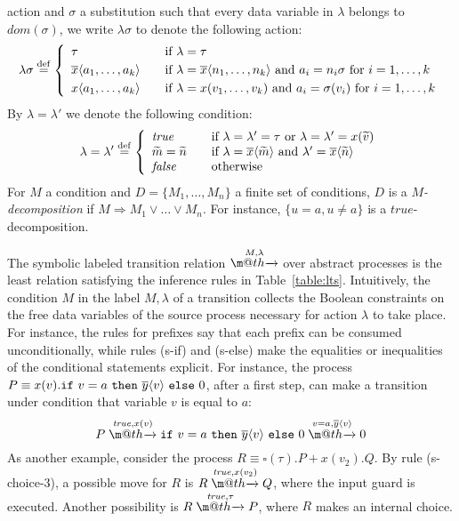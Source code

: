 \documentclass[submission,copyright,creativecommons]{eptcs}
\makeatletter
\newcommand{\opaque}{\square}
\newcommand{\outp}[2]{\overline{#1}\langle{#2}\rangle}
\newcommand{\inp}[2]{#1(#2)}
\newcommand{\finp}[2]{{#1}\langle{#2}\rangle}
\newcommand{\ifte}[3]{{\tt if}\ #1\ {\tt then }\ #2\ {\tt else }\ #3}
\newcommand{\tuple}[1]{\widetilde{#1}}
\newcommand{\act}{\lambda}
\newcommand{\tr}[1]{\stackrel{#1}{\rightarrowfill}}
\newcommand{\true}{\mathit{true}}
\newcommand{\false}{\mathit{false}}
\def \rightarrowfill{\m@th\mathord{\smash-}\mkern-6mu\cleaders\hbox{$\mkern-2mu\mathord{\smash-}\mkern-2mu$}\hfill
  \mkern-6mu\mathord\rightarrow}
\newcommand{\dom}{\mathit{dom}}
\makeatother
\begin{document}
action and $\sigma$ a substitution such that every data variable in 
$\lambda$ belongs to $\dom(\sigma)$, we write $\lambda \sigma$ to 
denote the following action:
 \[
   \act \sigma \mathrel{\mathop{=}\limits^{\rm def}}   
     \left \{ 
             {\begin{array}{l@{\qquad}l}
              \tau & \mbox{if $\lambda = \tau$}\\[1mm]
              \outp x {a_1,\ldots,a_k} & \mbox{if $\lambda = \outp x 
               {n_1,\ldots,n_k}$ and $a_i = n_i \sigma$ for 
                $i=1,\ldots,k$}\\[1mm]
              \finp x {a_1,\ldots,a_k} & \mbox{if $\lambda = \inp x 
                {v_1,\ldots,v_k}$ and $a_i = \sigma(v_i)$ for $i=1,\ldots,k$}
              \end{array}}
      \right .
 \]
By $\act = \act'$ we denote the following condition:
\[
 \act = \act' \mathrel{\mathop{=}\limits^{\rm def}}
   \left \{ 
             {\begin{array}{l@{\qquad}l}
   \true & \mbox{if $\act=\act'=\tau$ or $\act= \act' = \inp x {\tuple v}$}\\  
   \tuple m  = \tuple n & \mbox{if $\act= \outp x {\tuple m}$ and 
    $\act'=\outp x {\tuple n}$}\\
  \false & \mbox{otherwise}
  \end{array}}
 \right .
\]  
For $M$ a condition and $D =\{M_1,\ldots,M_n\}$ a finite set of
conditions, $D$ is a {\em $M$-decomposition} if $M\Rightarrow M_1 \vee
\ldots \vee M_n $.  For instance, $\{u=a, u \neq a \}$ is a
$\true$-decomposition.

The symbolic labeled transition relation $\tr {M, \act}$ over abstract 
processes is the least relation satisfying the inference rules in
Table~\ref{table:lts}. 
Intuitively, the condition $M$ in the label $M, \act$ of a transition 
collects the Boolean constraints on the free data variables of the source 
process necessary for action $\act$ to take place. For instance, the rules 
for prefixes say that each prefix can be consumed unconditionally, while 
rules ({\sc s-if}) and ({\sc  s-else}) make the equalities or inequalities of 
the conditional statements explicit. For instance, the process $P \equiv \inp x v.
\ifte{v =a} {\outp y v}{0}$, after a first step, can make a transition
under condition that variable $v$ is equal to $a$:
\[
  P \tr {\true, \inp x v} \ifte{v =a} {\outp y v}{0} \tr {v = a, \outp y v} 0 
\]
As another example, consider the process $R \equiv \inp{\opaque}\tau.P+\inp{x}{v_2}.Q$. 
By rule ({\sc s-choice-3}), a possible move for $R$ is $R \tr{\true, \inp x {v_2}} Q$, 
where the input guard is executed. Another possibility is $R \tr{\true,\tau} P$, where 
$R$ makes an internal choice. 
\end{document}
